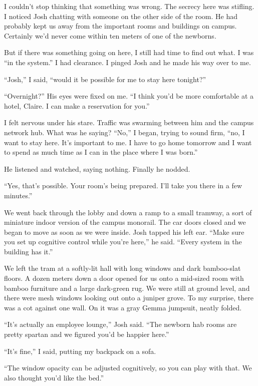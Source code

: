 \documentclass[10pt,b5paper]{article}
\begin{document}
I couldn't stop thinking that something was wrong. The secrecy here
was stifling. I noticed Josh chatting with someone on the other side
of the room. He had probably kept us away from the important rooms
and buildings on campus. Certainly we'd never come within ten meters
of one of the newborns.

But if there was something going on here, I still had time to find
out what. I was ``in the system.'' I had clearance. I pinged Josh
and he made his way over to me.

``Josh,'' I said, ``would it be possible for me to stay here tonight?''

``Overnight?'' His eyes were fixed on me.  ``I think you'd be more
comfortable at a hotel, Claire. I can make a reservation for you.''

I felt nervous under his stare. Traffic was swarming between him
and the campus network hub. What was he saying?  ``No,'' I began,
trying to sound firm, ``no, I want to stay here.  It's important to
me. I have to go home tomorrow and I want to spend as much time as
I can in the place where I was born.''

He listened and watched, saying nothing. Finally he nodded.

``Yes, that's possible. Your room's being prepared. I'll take you
there in a few minutes.''

We went back through the lobby and down a ramp to a small tramway,
a sort of miniature indoor version of the campus monorail.  The car
doors closed and we began to move as soon as we were inside. Josh
tapped his left ear.  ``Make sure you set up cognitive control while
you're here,'' he said.  ``Every system in the building has it.''

We left the tram at a softly-lit hall with long windows and dark
bamboo-slat floors. A dozen meters down a door opened for us onto a
mid-sized room with bamboo furniture and a large dark-green rug. We
were still at ground level, and there were mesh windows looking out
onto a juniper grove. To my surprise, there was a cot against one
wall. On it was a gray Gemma jumpsuit, neatly folded.

``It's actually an employee lounge,'' Josh said. ``The newborn hab
rooms are pretty spartan and we figured you'd be happier here.''

``It's fine,'' I said, putting my backpack on a sofa.

``The window opacity can be adjusted cognitively, so you can play
with that. We also thought you'd like the bed.''
\end{document}
